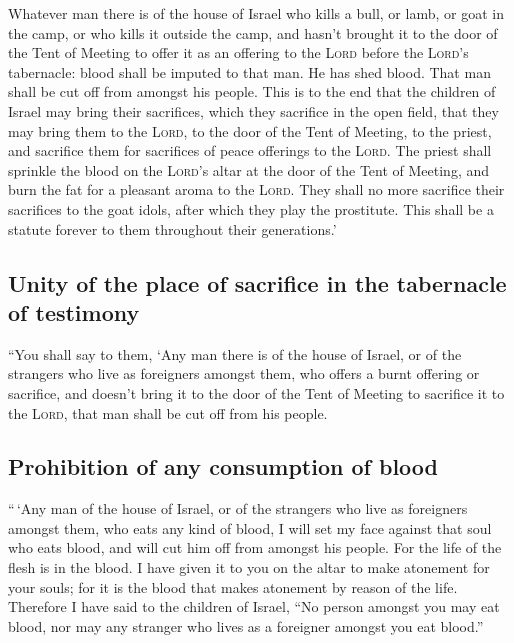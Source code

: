  Whatever man there is of the house of Israel who kills a
bull, or lamb, or goat in the camp, or who kills it outside the camp,
 and hasn't brought it to the door of the Tent of Meeting
to offer it as an offering to the \textsc{Lord} before the
\textsc{Lord}'s tabernacle: blood shall be imputed to that man. He has
shed blood. That man shall be cut off from amongst his people.
 This is to the end that the children of Israel may bring
their sacrifices, which they sacrifice in the open field, that they may
bring them to the \textsc{Lord}, to the door of the Tent of Meeting, to
the priest, and sacrifice them for sacrifices of peace offerings to the
\textsc{Lord}.  The priest shall sprinkle the blood on the
\textsc{Lord}'s altar at the door of the Tent of Meeting, and burn the
fat for a pleasant aroma to the \textsc{Lord}.  They shall
no more sacrifice their sacrifices to the goat idols, after which they
play the prostitute. This shall be a statute forever to them throughout
their generations.'

\hypertarget{unity-of-the-place-of-sacrifice-in-the-tabernacle-of-testimony}{%
\subsection{Unity of the place of sacrifice in the tabernacle of
testimony}\label{unity-of-the-place-of-sacrifice-in-the-tabernacle-of-testimony}}

 ``You shall say to them, `Any man there is of the house
of Israel, or of the strangers who live as foreigners amongst them, who
offers a burnt offering or sacrifice,  and doesn't bring
it to the door of the Tent of Meeting to sacrifice it to the
\textsc{Lord}, that man shall be cut off from his people.

\hypertarget{prohibition-of-any-consumption-of-blood}{%
\subsection{Prohibition of any consumption of
blood}\label{prohibition-of-any-consumption-of-blood}}

 ``\,`Any man of the house of Israel, or of the strangers
who live as foreigners amongst them, who eats any kind of blood, I will
set my face against that soul who eats blood, and will cut him off from
amongst his people.  For the life of the flesh is in the
blood. I have given it to you on the altar to make atonement for your
souls; for it is the blood that makes atonement by reason of the life.
 Therefore I have said to the children of Israel, ``No
person amongst you may eat blood, nor may any stranger who lives as a
foreigner amongst you eat blood.''

